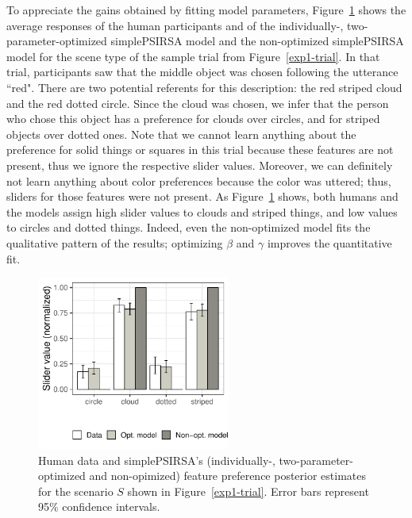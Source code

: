 \documentclass[11pt,a4paper]{article}
\begin{document}
To appreciate the gains obtained by fitting model parameters, Figure~\ref{barplot_x4} shows the average responses of the human participants and of the individually-, two-parameter-optimized simplePSIRSA model and the non-optimized simplePSIRSA model for the scene type of the sample trial from Figure~\ref{exp1-trial}.
In that trial, participants saw that the middle object was chosen following the utterance ``red". There are two potential referents for this description: the red striped cloud and the red dotted circle. Since the cloud was chosen, we infer that the person who chose this object has a preference for clouds over circles, and for striped objects over dotted ones. 
Note that we cannot learn anything about the preference for solid things or squares in this trial because these features are not present, thus we ignore the respective slider values. 
Moreover, we can definitely not learn anything about color preferences because the color was uttered; thus, sliders for those features were not present.  
As Figure~\ref{barplot_x4} shows, both humans and the models assign high slider values to clouds and striped things, and low values to circles and dotted things. Indeed, even the non-optimized model fits the qualitative pattern of the results; optimizing $\beta$ and $\gamma$ improves the quantitative fit.


\begin{figure}[ht!]
	\centering
	\includegraphics[width=2.5in]{images/december_barplot_x4.pdf}
	\caption{Human data and simplePSIRSA's (individually-, two-parameter-optimized and non-opimized) feature preference posterior estimates for the scenario $S$ shown in Figure~\ref{exp1-trial}. Error bars represent 95\% confidence intervals.}\label{barplot_x4}
\end{figure}
\end{document}
